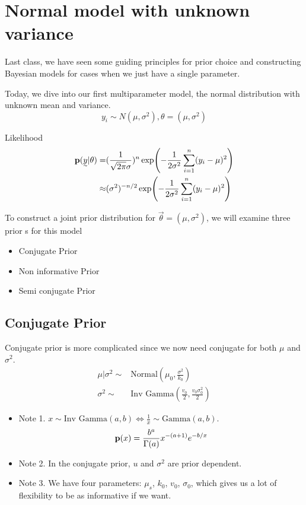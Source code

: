 \section{Normal model with unknown variance}

Last class, we have seen some guiding principles for prior choice and constructing Bayesian models for cases when we just have a single parameter.

Today, we dive into our first multiparameter model, the normal distribution with unknown mean and variance.
\[
y_i \sim N(\mu, \sigma^2), \theta = (\mu, \sigma^2)
\]

Likelihood
\begin{align*}
    \p(\vec{y}| \theta) 
    =& (\frac{1}{\sqrt{2\pi}\sigma})^n \exp(-\frac{1}{2\sigma^2} \sum_{i=1}^n(y_i - \mu)^2)\\
    \approx& (\sigma^2)^{-n/2} \exp(-\frac{1}{2\sigma^2} \sum_{i=1}^n(y_i - \mu)^2)
\end{align*}

To construct a joint prior distribution for $\vec{\theta} = (\mu, \sigma^2)$, we will examine three prior s for this model
\begin{itemize}
    \item Conjugate Prior
    \item Non informative Prior
    \item Semi conjugate Prior
\end{itemize}

\subsection{Conjugate Prior}

Conjugate prior is more complicated since we now need conjugate for both $\mu$ and $\sigma^2$.
\begin{align*}
    \mu| \sigma^2 \sim& \text{Normal}(\mu_0, \frac{\sigma^2}{k_0})\\
    \sigma^2 \sim& \text{Inv Gamma} (\frac{v_0}{2}, \frac{v_0 \sigma^2_0}{2})
\end{align*}

\begin{itemize}
    \item Note 1. $x \sim \text{Inv Gamma} (a, b) \iff \frac{1}{x} \sim \text{Gamma}(a, b)$.
    \[
        {\mathbf p}(x) = \frac{b^a}{\Gamma(a)} x^{-(a+1)} e^{-b/x}
    \]
    \item Note 2. In the conjugate prior, $u$ and $\sigma^2$ are prior dependent.
    \item Note 3. We have four parameters: $\mu_s$, $k_0$, $v_0$, $\sigma_0$, which gives us a lot of flexibility to be as informative if we want.
\end{itemize}

